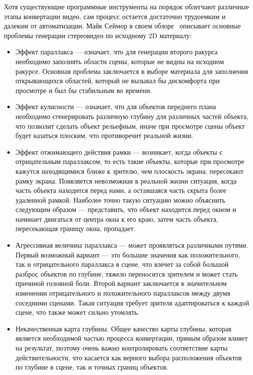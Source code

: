 \documentclass[14pt, a4paper]{extarticle}
\begin{document}
Хотя существующие программные инструменты на порядок облегчают различные 
этапы конвертации видео, сам процесс остается достаточно трудоемким и 
далеким от автоматизации. Майк Сеймор в своем обзоре~\cite{seymour2012art} 
описывает основные проблемы генерации стереовидео по исходному 2D материалу:
\begin{itemize}
	\item Эффект параллакса --- означает, что для генерации второго ракурса 
	необходимо заполнять области сцены, которые не видны на исходном ракурсе. 
	Основная проблема заключается в выборе материала для заполнения открывающихся 
	областей, который не вызывал бы дискомфорта при просмотре и был бы стабильным во времени.
	\item Эффект кулисности --- означает, что для объектов переднего плана необходимо 
	сгенерировать различную глубину для различных частей объекта, что позволит сделать 
	объект рельефным, иначе при просмотре сцены объект будет казаться плоским, 
	что противоречит реальной жизни.
	\item Эффект отжимающего действия рамки --- возникает, когда объекты с отрицательным 
	параллаксом, то есть такие объекты, которые при просмотре кажутся находящимися ближе к зрителю, 
	чем плоскость экрана, пересекают рамку экрана. Появляется невозможная в реальной 
	жизни ситуация, когда часть объекта находится перед нами, а оставшаяся часть скрыта 
	более удаленной рамкой. Наиболее точно такую ситуацию можно объяснить следующим 
	образом --- представить, что объект находится перед окном и начинает двигаться 
	от центра окна к его краю, затем часть объекта, пересекающая границу окна, пропадает.
	\item Агрессивная величина параллакса --- может проявляться различными путями. 
	Первый возможный вариант --- это большие значения как положительного, так и 
	отрицательного параллакса в сцене, что влечет за собой большой разброс объектов 
	по глубине, тяжело переносится зрителем и может стать причиной головной боли. 
	Второй вариант заключается в значительном изменении отрицательного и положительного 
	параллаксов между двумя соседними сценами. Такая ситуация требует зрителя 
	адаптироваться к каждой сцене, что также может сильно утомлять.
	\item Некачественная карта глубины. Общее качество карты глубины, которая является 
	необходимой частью процесса конвертации, прямым образом влияет на результат, 
	поэтому очень важно контролировать соответствие карты действительности, 
	что касается как верного выбора расположения объектов по глубине в сцене, 
	так и точных границ объектов.
\end{itemize}
\end{document}
